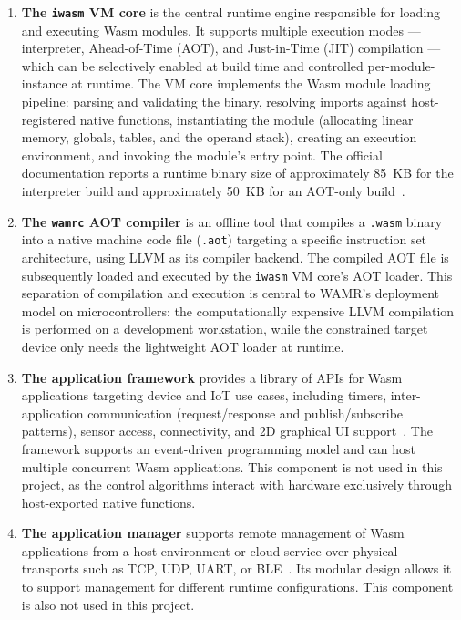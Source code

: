 \documentclass[12pt, a4paper]{report}
\begin{document}
\begin{enumerate}
    \item \textbf{The \texttt{iwasm} VM core} is the central runtime engine responsible for
    loading and executing Wasm modules. It supports multiple execution modes --- interpreter,
    Ahead-of-Time (AOT), and Just-in-Time (JIT) compilation --- which can be selectively
    enabled at build time and controlled per-module-instance at runtime. The VM core
    implements the Wasm module loading pipeline: parsing and validating the binary, resolving
    imports against host-registered native functions, instantiating the module (allocating
    linear memory, globals, tables, and the operand stack), creating an execution environment,
    and invoking the module's entry point. The official documentation reports a runtime binary
    size of approximately 85~KB for the interpreter build and approximately 50~KB for an
    AOT-only build~\cite{wamr-project-doc}.

    \item \textbf{The \texttt{wamrc} AOT compiler} is an offline tool that compiles a
    \texttt{.wasm} binary into a native machine code file (\texttt{.aot}) targeting a
    specific instruction set architecture, using LLVM as its compiler backend. The compiled
    AOT file is subsequently loaded and executed by the \texttt{iwasm} VM core's AOT loader.
    This separation of compilation and execution is central to WAMR's deployment model on
    microcontrollers: the computationally expensive LLVM compilation is performed on a
    development workstation, while the constrained target device only needs the lightweight
    AOT loader at runtime.

    \item \textbf{The application framework} provides a library of APIs for Wasm applications
    targeting device and IoT use cases, including timers, inter-application communication
    (request/response and publish/subscribe patterns), sensor access, connectivity, and 2D
    graphical UI support~\cite{wamr-project-doc}. The framework supports an event-driven
    programming model and can host multiple concurrent Wasm applications. This component is
    not used in this project, as the control algorithms interact with hardware exclusively
    through host-exported native functions.

    \item \textbf{The application manager} supports remote management of Wasm applications
    from a host environment or cloud service over physical transports such as TCP, UDP, UART,
    or BLE~\cite{wamr-project-doc}. Its modular design allows it to support management for
    different runtime configurations. This component is also not used in this project.
\end{enumerate}
\end{document}
